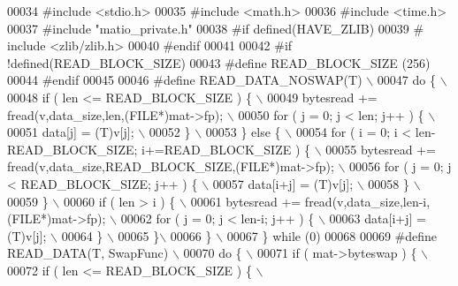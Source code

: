 \begin{DoxyCode}
00034 \textcolor{preprocessor}{#include <stdio.h>}
00035 \textcolor{preprocessor}{#include <math.h>}
00036 \textcolor{preprocessor}{#include <time.h>}
00037 \textcolor{preprocessor}{#include "matio\_private.h"}
00038 \textcolor{preprocessor}{#if defined(HAVE\_ZLIB)}
00039 \textcolor{preprocessor}{#   include <zlib/zlib.h>}
00040 \textcolor{preprocessor}{#endif}
00041 
00042 \textcolor{preprocessor}{#if !defined(READ\_BLOCK\_SIZE)}
00043 \textcolor{preprocessor}{#define READ\_BLOCK\_SIZE (256)}
00044 \textcolor{preprocessor}{#endif}
00045 
00046 \textcolor{preprocessor}{#define READ\_DATA\_NOSWAP(T) \(\backslash\)}
00047 \textcolor{preprocessor}{    do \{ \(\backslash\)}
00048 \textcolor{preprocessor}{        if ( len <= READ\_BLOCK\_SIZE ) \{ \(\backslash\)}
00049 \textcolor{preprocessor}{            bytesread += fread(v,data\_size,len,(FILE*)mat->fp); \(\backslash\)}
00050 \textcolor{preprocessor}{            for ( j = 0; j < len; j++ ) \{ \(\backslash\)}
00051 \textcolor{preprocessor}{                data[j] = (T)v[j]; \(\backslash\)}
00052 \textcolor{preprocessor}{            \} \(\backslash\)}
00053 \textcolor{preprocessor}{        \} else \{ \(\backslash\)}
00054 \textcolor{preprocessor}{            for ( i = 0; i < len-READ\_BLOCK\_SIZE; i+=READ\_BLOCK\_SIZE ) \{ \(\backslash\)}
00055 \textcolor{preprocessor}{                bytesread += fread(v,data\_size,READ\_BLOCK\_SIZE,(FILE*)mat->fp); \(\backslash\)}
00056 \textcolor{preprocessor}{                for ( j = 0; j < READ\_BLOCK\_SIZE; j++ ) \{ \(\backslash\)}
00057 \textcolor{preprocessor}{                    data[i+j] = (T)v[j]; \(\backslash\)}
00058 \textcolor{preprocessor}{                \} \(\backslash\)}
00059 \textcolor{preprocessor}{            \} \(\backslash\)}
00060 \textcolor{preprocessor}{            if ( len > i ) \{ \(\backslash\)}
00061 \textcolor{preprocessor}{                bytesread += fread(v,data\_size,len-i,(FILE*)mat->fp); \(\backslash\)}
00062 \textcolor{preprocessor}{                for ( j = 0; j < len-i; j++ ) \{ \(\backslash\)}
00063 \textcolor{preprocessor}{                    data[i+j] = (T)v[j]; \(\backslash\)}
00064 \textcolor{preprocessor}{                \} \(\backslash\)}
00065 \textcolor{preprocessor}{            \}\(\backslash\)}
00066 \textcolor{preprocessor}{        \} \(\backslash\)}
00067 \textcolor{preprocessor}{    \} while (0)}
00068 
00069 \textcolor{preprocessor}{#define READ\_DATA(T, SwapFunc) \(\backslash\)}
00070 \textcolor{preprocessor}{    do \{ \(\backslash\)}
00071 \textcolor{preprocessor}{        if ( mat->byteswap ) \{ \(\backslash\)}
00072 \textcolor{preprocessor}{            if ( len <= READ\_BLOCK\_SIZE ) \{ \(\backslash\)}

\end{DoxyCode}
